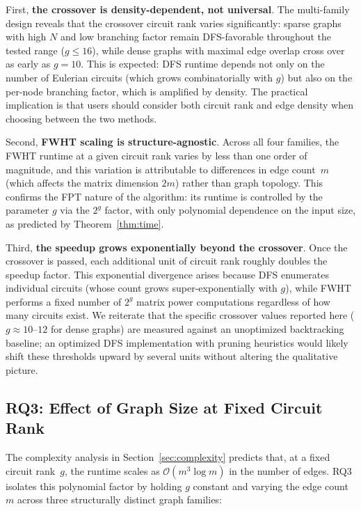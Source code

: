\documentclass[acmsmall,review]{acmart}
\newcommand{\bigO}{\mathcal{O}}
\begin{document}
	First, \textbf{the crossover is density-dependent, not universal}. The multi-family design reveals that the crossover circuit rank varies significantly: sparse graphs with high $N$ and low branching factor remain DFS-favorable throughout the tested range ($g \le 16$), while dense graphs with maximal edge overlap cross over as early as $g = 10$. This is expected: DFS runtime depends not only on the number of Eulerian circuits (which grows combinatorially with $g$) but also on the per-node branching factor, which is amplified by density. The practical implication is that users should consider both circuit rank and edge density when choosing between the two methods.
	
	Second, \textbf{FWHT scaling is structure-agnostic}. Across all four families, the FWHT runtime at a given circuit rank varies by less than one order of magnitude, and this variation is attributable to differences in edge count~$m$ (which affects the matrix dimension $2m$) rather than graph topology. This confirms the FPT nature of the algorithm: its runtime is controlled by the parameter $g$ via the $2^g$ factor, with only polynomial dependence on the input size, as predicted by Theorem~\ref{thm:time}.
	
	Third, \textbf{the speedup grows exponentially beyond the crossover}. Once the crossover is passed, each additional unit of circuit rank roughly doubles the speedup factor. This exponential divergence arises because DFS enumerates individual circuits (whose count grows super-exponentially with $g$), while FWHT performs a fixed number of $2^g$ matrix power computations regardless of how many circuits exist. We reiterate that the specific crossover values reported here ($g \approx 10$--$12$ for dense graphs) are measured against an unoptimized backtracking baseline; an optimized DFS implementation with pruning heuristics would likely shift these thresholds upward by several units without altering the qualitative picture.
	
	\subsection{RQ3: Effect of Graph Size at Fixed Circuit Rank}
	\label{subsec:exp3}
	
	The complexity analysis in Section~\ref{sec:complexity} predicts that, at a fixed circuit rank~$g$, the runtime scales as $\bigO(m^3 \log m)$ in the number of edges. RQ3 isolates this polynomial factor by holding $g$ constant and varying the edge count~$m$ across three structurally distinct graph families:
	
\end{document}
